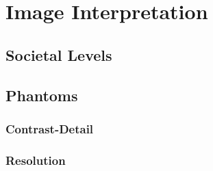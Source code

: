 \documentclass[mphy386-notes.tex]{subfiles}
\begin{document}
\section{Image Interpretation}
\subsection{Societal Levels}
\subsection{Phantoms}
\subsubsection{Contrast-Detail}
\subsubsection{Resolution}
\pagebreak
\end{document}
